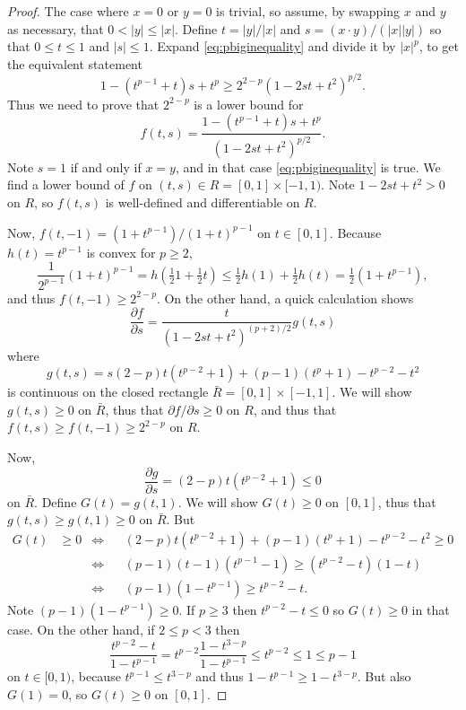 \documentclass[final,onefignum]{siamart190516}
\begin{document}
\begin{proof}  The case where $x=0$ or $y=0$ is trivial, so assume, by swapping $x$ and $y$ as necessary, that $0 < |y| \le |x|$.  Define $t=|y|/|x|$ and $s = (x\cdot y)/(|x||y|)$ so that $0\le t \le 1$ and $|s|\le 1$.  Expand \eqref{eq:pbiginequality} and divide it by $|x|^p$, to get the equivalent statement
    $$1 - (t^{p-1}+t) s + t^p \ge 2^{2-p} \left(1 - 2 s t + t^2\right)^{p/2}.$$
Thus we need to prove that $2^{2-p}$ is a lower bound for
	$$f(t,s) = \frac{1 - (t^{p-1}+t) s + t^p}{\left(1 - 2 s t + t^2\right)^{p/2}}.$$
Note $s=1$ if and only if $x=y$, and in that case \eqref{eq:pbiginequality} is true.  We find a lower bound of $f$ on $(t,s) \in R=[0,1]\times[-1,1)$.  Note $1-2st+t^2 > 0$ on $ R$, so $f(t,s)$ is well-defined and differentiable on $R$.

Now, $f(t,-1) = \left(1 + t^{p-1}\right) / \left(1 + t\right)^{p-1}$ on $t\in[0,1]$.  Because $h(t)=t^{p-1}$ is convex for $p \ge 2$,
    $$\frac{1}{2^{p-1}} (1+t)^{p-1} = h(\tfrac{1}{2} 1 + \tfrac{1}{2} t) \le \tfrac{1}{2} h(1) + \tfrac{1}{2} h(t) = \tfrac{1}{2} (1 + t^{p-1}),$$
and thus $f(t,-1) \ge 2^{2-p}$.  On the other hand, a quick calculation shows
    $$\frac{\partial f}{\partial s} = \frac{t}{\left(1 - 2 s t + t^2\right)^{(p+2)/2}} g(t,s)$$
where
    $$g(t,s) = s(2-p) t (t^{p-2} + 1) + (p-1) (t^p+1) - t^{p-2} - t^2$$
is continuous on the closed rectangle $\bar R = [0,1]\times[-1,1]$.  We will show $g(t,s)\ge 0$ on $\bar R$, thus that $\partial f/\partial s \ge 0$ on $R$, and thus that $f(t,s)\ge f(t,-1) \ge  2^{2-p}$ on $R$.

Now,
    $$\frac{\partial g}{\partial s} = (2-p) t (t^{p-2} + 1) \le 0$$
on $\bar R$.  Define $G(t) = g(t,1)$.  We will show $G(t)\ge 0$ on $[0,1]$, thus that $g(t,s)\ge g(t,1)\ge 0$ on $\bar R$.  But
\begin{align*}
G(t) &\ge 0 &\iff && (2-p) t (t^{p-2} + 1) + (p-1) (t^p+1) - t^{p-2} - t^2 \ge 0 \\
          & &\iff && (p-1) (t-1) (t^{p-1}-1) \ge (t^{p-2} - t) (1 - t)  \\
          & &\iff && (p-1) (1 - t^{p-1}) \ge t^{p-2} - t.
\end{align*}
Note $(p-1) (1 - t^{p-1}) \ge 0$.  If $p\ge 3$ then $t^{p-2} - t \le 0$ so $G(t)\ge 0$ in that case.  On the other hand, if $2\le p < 3$ then
	$$\frac{t^{p-2} - t}{1 - t^{p-1}} = t^{p-2} \frac{1 - t^{3-p}}{1 - t^{p-1}} \le t^{p-2} \le 1 \le p-1$$
on $t\in[0,1)$, because $t^{p-1}\le t^{3-p}$ and thus $1 - t^{p-1} \ge 1 - t^{3-p}$.  But also $G(1)=0$, so $G(t)\ge 0$ on $[0,1]$. \end{proof}
\end{document}
